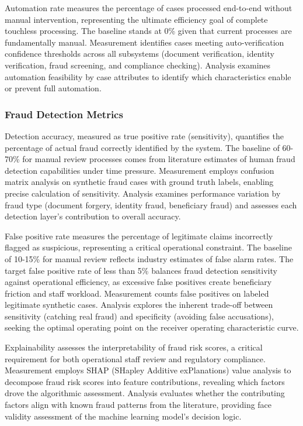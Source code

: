 Automation rate measures the percentage of cases processed end-to-end without manual intervention, representing the ultimate efficiency goal of complete touchless processing. The baseline stands at 0\% given that current processes are fundamentally manual. Measurement identifies cases meeting auto-verification confidence thresholds across all subsystems (document verification, identity verification, fraud screening, and compliance checking). Analysis examines automation feasibility by case attributes to identify which characteristics enable or prevent full automation.

\subsubsection{Fraud Detection Metrics}

Detection accuracy, measured as true positive rate (sensitivity), quantifies the percentage of actual fraud correctly identified by the system. The baseline of 60-70\% for manual review processes comes from literature estimates of human fraud detection capabilities under time pressure. Measurement employs confusion matrix analysis on synthetic fraud cases with ground truth labels, enabling precise calculation of sensitivity. Analysis examines performance variation by fraud type (document forgery, identity fraud, beneficiary fraud) and assesses each detection layer's contribution to overall accuracy.

False positive rate measures the percentage of legitimate claims incorrectly flagged as suspicious, representing a critical operational constraint. The baseline of 10-15\% for manual review reflects industry estimates of false alarm rates. The target false positive rate of less than 5\% balances fraud detection sensitivity against operational efficiency, as excessive false positives create beneficiary friction and staff workload. Measurement counts false positives on labeled legitimate synthetic cases. Analysis explores the inherent trade-off between sensitivity (catching real fraud) and specificity (avoiding false accusations), seeking the optimal operating point on the receiver operating characteristic curve.

Explainability assesses the interpretability of fraud risk scores, a critical requirement for both operational staff review and regulatory compliance. Measurement employs SHAP (SHapley Additive exPlanations) value analysis to decompose fraud risk scores into feature contributions, revealing which factors drove the algorithmic assessment. Analysis evaluates whether the contributing factors align with known fraud patterns from the literature, providing face validity assessment of the machine learning model's decision logic.

